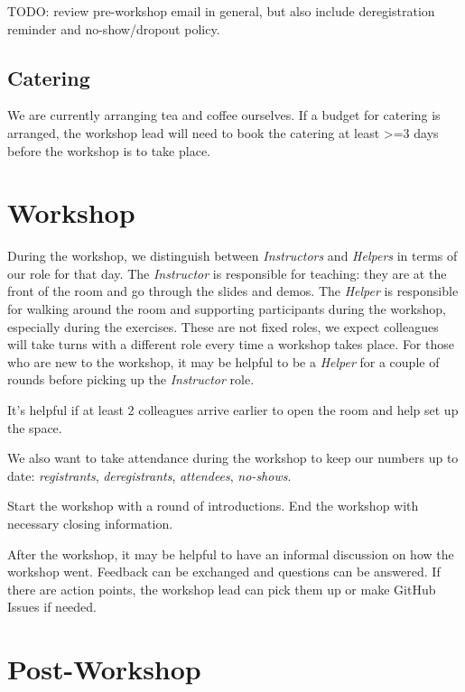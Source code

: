 \documentclass[
  letterpaper,
  DIV=11,
  numbers=noendperiod]{scrreprt}
\begin{document}
TODO: review pre-workshop email in general, but also include
deregistration reminder and no-show/dropout policy.

\subsection*{Catering}\label{catering}

We are currently arranging tea and coffee ourselves. If a budget for
catering is arranged, the workshop lead will need to book the catering
at least \textgreater=3 days before the workshop is to take place.

\section*{Workshop}\label{workshop}


During the workshop, we distinguish between \emph{Instructors} and
\emph{Helpers} in terms of our role for that day. The \emph{Instructor}
is responsible for teaching: they are at the front of the room and go
through the slides and demos. The \emph{Helper} is responsible for
walking around the room and supporting participants during the workshop,
especially during the exercises. These are not fixed roles, we expect
colleagues will take turns with a different role every time a workshop
takes place. For those who are new to the workshop, it may be helpful to
be a \emph{Helper} for a couple of rounds before picking up the
\emph{Instructor} role.

It's helpful if at least 2 colleagues arrive earlier to open the room
and help set up the space.

We also want to take attendance during the workshop to keep our numbers
up to date: \emph{registrants}, \emph{deregistrants}, \emph{attendees},
\emph{no-shows}.

Start the workshop with a round of introductions. End the workshop with
necessary closing information.

After the workshop, it may be helpful to have an informal discussion on
how the workshop went. Feedback can be exchanged and questions can be
answered. If there are action points, the workshop lead can pick them up
or make GitHub Issues if needed.

\section*{Post-Workshop}\label{post-workshop}
\end{document}

